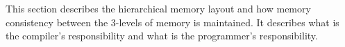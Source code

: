 This section describes the hierarchical memory layout and how memory consistency between
the 3-levels of memory is maintained.  It describes what is the compiler's responsibility
and what is the programmer's responsibility.









